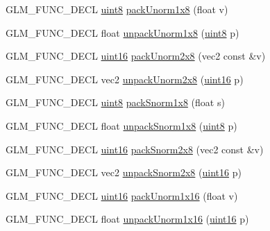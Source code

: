 \begin{DoxyCompactItemize}
G\+L\+M\+\_\+\+F\+U\+N\+C\+\_\+\+D\+E\+C\+L \hyperlink{group__gtc__type__precision_ga1a7dcd8aac97cc8020817c94049deff2}{uint8} \hyperlink{group__gtc__packing_ga2f9963e5d762b10085b280d3662017ba}{pack\+Unorm1x8} (float v)
\item 
G\+L\+M\+\_\+\+F\+U\+N\+C\+\_\+\+D\+E\+C\+L float \hyperlink{group__gtc__packing_ga32f3f2642df2ea87449d59fb614a8305}{unpack\+Unorm1x8} (\hyperlink{group__gtc__type__precision_ga1a7dcd8aac97cc8020817c94049deff2}{uint8} p)
\item 
G\+L\+M\+\_\+\+F\+U\+N\+C\+\_\+\+D\+E\+C\+L \hyperlink{group__gtc__type__precision_gad8c2939e1fdd8e5828b31d95c52255d5}{uint16} \hyperlink{group__gtc__packing_ga833288fc0d4a79f19d0db75a6843bfe6}{pack\+Unorm2x8} (vec2 const \&v)
\item 
G\+L\+M\+\_\+\+F\+U\+N\+C\+\_\+\+D\+E\+C\+L vec2 \hyperlink{group__gtc__packing_ga96ce0c24339ee676e28a027fffd1edf6}{unpack\+Unorm2x8} (\hyperlink{group__gtc__type__precision_gad8c2939e1fdd8e5828b31d95c52255d5}{uint16} p)
\item 
G\+L\+M\+\_\+\+F\+U\+N\+C\+\_\+\+D\+E\+C\+L \hyperlink{group__gtc__type__precision_ga1a7dcd8aac97cc8020817c94049deff2}{uint8} \hyperlink{group__gtc__packing_ga26b6cd7a35c46c4b6a342f3b97b47423}{pack\+Snorm1x8} (float s)
\item 
G\+L\+M\+\_\+\+F\+U\+N\+C\+\_\+\+D\+E\+C\+L float \hyperlink{group__gtc__packing_ga6f2bebf536fbf7c8b97d4b306bb3354e}{unpack\+Snorm1x8} (\hyperlink{group__gtc__type__precision_ga1a7dcd8aac97cc8020817c94049deff2}{uint8} p)
\item 
G\+L\+M\+\_\+\+F\+U\+N\+C\+\_\+\+D\+E\+C\+L \hyperlink{group__gtc__type__precision_gad8c2939e1fdd8e5828b31d95c52255d5}{uint16} \hyperlink{group__gtc__packing_ga05d08a82923166ec7cd5d0e6154c9953}{pack\+Snorm2x8} (vec2 const \&v)
\item 
G\+L\+M\+\_\+\+F\+U\+N\+C\+\_\+\+D\+E\+C\+L vec2 \hyperlink{group__gtc__packing_ga27f30f0281b88e152b0895f5e2ead878}{unpack\+Snorm2x8} (\hyperlink{group__gtc__type__precision_gad8c2939e1fdd8e5828b31d95c52255d5}{uint16} p)
\item 
G\+L\+M\+\_\+\+F\+U\+N\+C\+\_\+\+D\+E\+C\+L \hyperlink{group__gtc__type__precision_gad8c2939e1fdd8e5828b31d95c52255d5}{uint16} \hyperlink{group__gtc__packing_ga60c7d915f5653559ae02c2f79a8c5c1d}{pack\+Unorm1x16} (float v)
\item 
G\+L\+M\+\_\+\+F\+U\+N\+C\+\_\+\+D\+E\+C\+L float \hyperlink{group__gtc__packing_ga7770e3ade4f4764cc1b2eb42ac4ec188}{unpack\+Unorm1x16} (\hyperlink{group__gtc__type__precision_gad8c2939e1fdd8e5828b31d95c52255d5}{uint16} p)

\end{DoxyCompactItemize}
